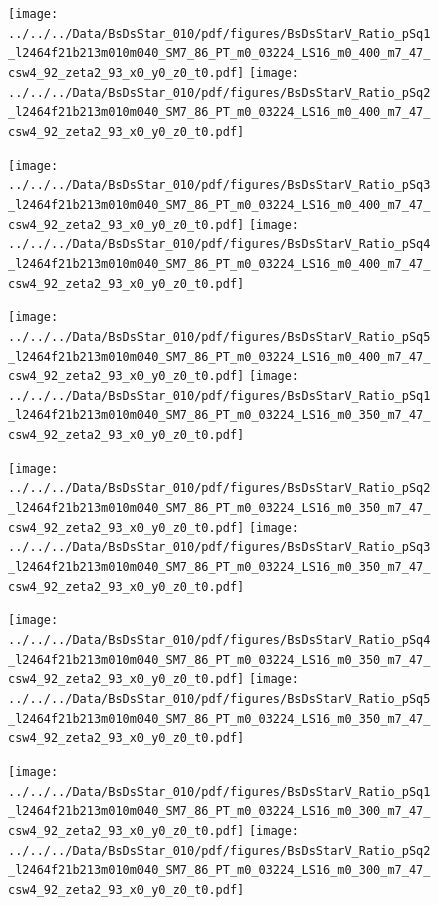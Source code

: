 \documentclass[a4paper,10pt]{article}
\begin{document}
\begin{figure}[p]
 \texttt{[image: ../../../Data/BsDsStar\_010/pdf/figures/BsDsStarV\_Ratio\_pSq1\_l2464f21b213m010m040\_SM7\_86\_PT\_m0\_03224\_LS16\_m0\_400\_m7\_47\_csw4\_92\_zeta2\_93\_x0\_y0\_z0\_t0.pdf]} 
 \texttt{[image: ../../../Data/BsDsStar\_010/pdf/figures/BsDsStarV\_Ratio\_pSq2\_l2464f21b213m010m040\_SM7\_86\_PT\_m0\_03224\_LS16\_m0\_400\_m7\_47\_csw4\_92\_zeta2\_93\_x0\_y0\_z0\_t0.pdf]} 
 \end{figure}
\begin{figure}[p]
 \texttt{[image: ../../../Data/BsDsStar\_010/pdf/figures/BsDsStarV\_Ratio\_pSq3\_l2464f21b213m010m040\_SM7\_86\_PT\_m0\_03224\_LS16\_m0\_400\_m7\_47\_csw4\_92\_zeta2\_93\_x0\_y0\_z0\_t0.pdf]} 
 \texttt{[image: ../../../Data/BsDsStar\_010/pdf/figures/BsDsStarV\_Ratio\_pSq4\_l2464f21b213m010m040\_SM7\_86\_PT\_m0\_03224\_LS16\_m0\_400\_m7\_47\_csw4\_92\_zeta2\_93\_x0\_y0\_z0\_t0.pdf]} 
 \end{figure}
\begin{figure}[p]
 \texttt{[image: ../../../Data/BsDsStar\_010/pdf/figures/BsDsStarV\_Ratio\_pSq5\_l2464f21b213m010m040\_SM7\_86\_PT\_m0\_03224\_LS16\_m0\_400\_m7\_47\_csw4\_92\_zeta2\_93\_x0\_y0\_z0\_t0.pdf]} 
 \texttt{[image: ../../../Data/BsDsStar\_010/pdf/figures/BsDsStarV\_Ratio\_pSq1\_l2464f21b213m010m040\_SM7\_86\_PT\_m0\_03224\_LS16\_m0\_350\_m7\_47\_csw4\_92\_zeta2\_93\_x0\_y0\_z0\_t0.pdf]} 
 \end{figure}
\clearpage
\begin{figure}[p]
 \texttt{[image: ../../../Data/BsDsStar\_010/pdf/figures/BsDsStarV\_Ratio\_pSq2\_l2464f21b213m010m040\_SM7\_86\_PT\_m0\_03224\_LS16\_m0\_350\_m7\_47\_csw4\_92\_zeta2\_93\_x0\_y0\_z0\_t0.pdf]} 
 \texttt{[image: ../../../Data/BsDsStar\_010/pdf/figures/BsDsStarV\_Ratio\_pSq3\_l2464f21b213m010m040\_SM7\_86\_PT\_m0\_03224\_LS16\_m0\_350\_m7\_47\_csw4\_92\_zeta2\_93\_x0\_y0\_z0\_t0.pdf]} 
 \end{figure}
\begin{figure}[p]
 \texttt{[image: ../../../Data/BsDsStar\_010/pdf/figures/BsDsStarV\_Ratio\_pSq4\_l2464f21b213m010m040\_SM7\_86\_PT\_m0\_03224\_LS16\_m0\_350\_m7\_47\_csw4\_92\_zeta2\_93\_x0\_y0\_z0\_t0.pdf]} 
 \texttt{[image: ../../../Data/BsDsStar\_010/pdf/figures/BsDsStarV\_Ratio\_pSq5\_l2464f21b213m010m040\_SM7\_86\_PT\_m0\_03224\_LS16\_m0\_350\_m7\_47\_csw4\_92\_zeta2\_93\_x0\_y0\_z0\_t0.pdf]} 
 \end{figure}
\begin{figure}[p]
 \texttt{[image: ../../../Data/BsDsStar\_010/pdf/figures/BsDsStarV\_Ratio\_pSq1\_l2464f21b213m010m040\_SM7\_86\_PT\_m0\_03224\_LS16\_m0\_300\_m7\_47\_csw4\_92\_zeta2\_93\_x0\_y0\_z0\_t0.pdf]} 
 \texttt{[image: ../../../Data/BsDsStar\_010/pdf/figures/BsDsStarV\_Ratio\_pSq2\_l2464f21b213m010m040\_SM7\_86\_PT\_m0\_03224\_LS16\_m0\_300\_m7\_47\_csw4\_92\_zeta2\_93\_x0\_y0\_z0\_t0.pdf]} 
 \end{figure}
\end{document}
